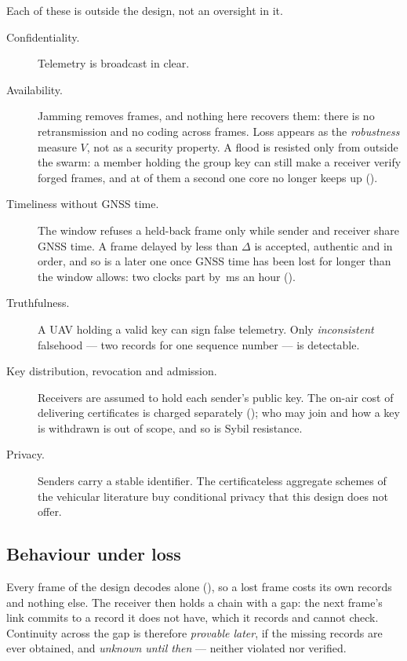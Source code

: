 Each of these is outside the design, not an oversight in it.

\begin{description}
\item[Confidentiality.] Telemetry is broadcast in clear.
\item[Availability.] Jamming removes frames, and nothing here recovers them: there is no
      retransmission and no coding across frames. Loss appears as the \emph{robustness} measure
      $V$, not as a security property. A flood is resisted only from outside the swarm: a member
      holding the group key can still make a receiver verify forged frames, and at
      \flInsiderRate{} of them a second one core no longer keeps up ().
\item[Timeliness without GNSS time.] The window refuses a held-back frame only while sender and
      receiver share GNSS time. A frame delayed by less than $\Delta$ is accepted, authentic and
      in order, and so is a later one once GNSS time has been lost for longer than the window
      allows: two clocks part by \rpDrift\,ms an hour ().
\item[Truthfulness.] A UAV holding a valid key can sign false telemetry. Only
      \emph{inconsistent} falsehood --- two records for one sequence number --- is detectable.
\item[Key distribution, revocation and admission.] Receivers are assumed to hold each sender's
      public key. The on-air cost of delivering certificates is charged separately
      (); who may join and how a key is withdrawn is out of scope, and so is
      Sybil resistance.
\item[Privacy.] Senders carry a stable identifier. The certificateless aggregate schemes of the
      vehicular literature buy conditional privacy that this design does not offer.
\end{description}

\subsection{Behaviour under loss}

Every frame of the design decodes alone (), so a lost frame costs its own
records and nothing else. The receiver then holds a chain with a gap: the next frame's link
commits to a record it does not have, which it records and cannot check. Continuity across the
gap is therefore \emph{provable later}, if the missing records are ever obtained, and
\emph{unknown until then} --- neither violated nor verified.

